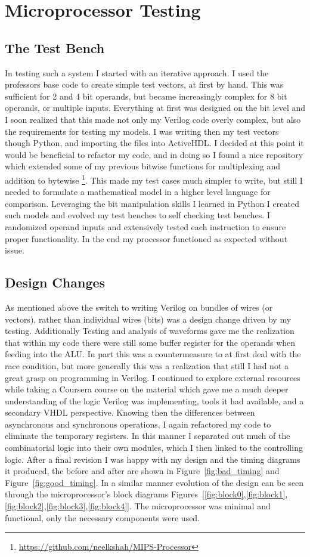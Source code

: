 \documentclass{article}
\begin{document}
\section{Microprocessor Testing}
\subsection{The Test Bench}
In testing such a system I started with an iterative approach.
I used the professors base code to create simple test vectors, at first by hand.
This was sufficient for 2 and 4 bit operands, but became increasingly complex for 8 bit operands, or multiple inputs.
Everything at first was designed on the bit level and I soon realized that this made not only my Verilog code overly complex, but also the requirements for testing my models.
I was writing then my test vectors though Python, and importing the files into ActiveHDL.
I decided at this point it would be beneficial to refactor my code, and in doing so I found a nice repository which extended some of my previous bitwise functions for multiplexing and addition to bytewise \footnote{\url{https://github.com/neelkshah/MIPS-Processor}}.
This made my test cases much simpler to write, but still I needed to formulate a mathematical model in a higher level language for comparison.
Leveraging the bit manipulation skills I learned in Python I created such models and evolved my test benches to self checking test benches.
I randomized operand inputs and extensively tested each instruction to ensure proper functionality.
In the end my processor functioned as expected without issue.

\subsection{Design Changes}
As mentioned above the switch to writing Verilog on bundles of wires (or vectors), rather than individual wires (bits) was a design change driven by my testing.
Additionally Testing and analysis of waveforms gave me the realization that within my code there were still some buffer register for the operands when feeding into the ALU.
In part this was a countermeasure to at first deal with the race condition, but more generally this was a realization that still I had not a great grasp on programming in Verilog.
I continued to explore external resources while taking a Coursera course on the material which gave me a much deeper understanding of the logic Verilog was implementing, tools it had available, and a secondary VHDL perspective.
Knowing then the differences between asynchronous and synchronous operations, I again refactored my code to eliminate the temporary registers.
In this manner I separated out much of the combinatorial logic into their own modules, which I then linked to the controlling logic.
After a final revision I was happy with my design and the timing diagrams it produced, the before and after are shown in Figure~\ref{fig:bad_timing} and Figure~\ref{fig:good_timing}.
In a similar manner evolution of the design can be seen through the microprocessor's block diagrams Figures~[\ref{fig:block0},\ref{fig:block1},\ref{fig:block2},\ref{fig:block3},\ref{fig:block4}].
The microprocessor was minimal and functional, only the necessary components were used.
\end{document}
